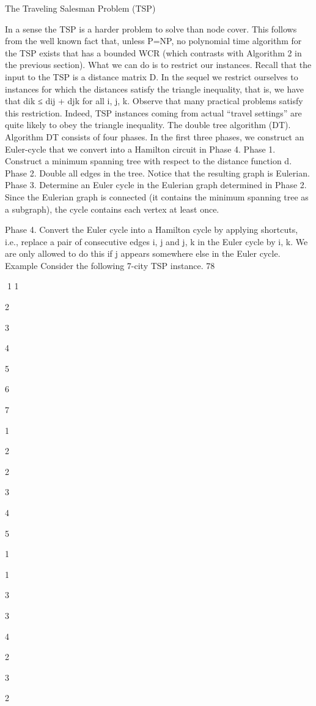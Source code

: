 \documentclass[titlepage]{book}
\theoremstyle{plain}
\theoremstyle{definition}
\theoremstyle{remark}
\begin{document}
The Traveling Salesman Problem (TSP)

In a sense the TSP is a harder problem to solve than node cover. This follows from the well known fact
that, unless P=NP, no polynomial time algorithm for the TSP exists that has a bounded WCR (which
contrasts with Algorithm 2 in the previous section).
What we can do is to restrict our instances. Recall that the input to the TSP is a distance matrix D. In
the sequel we restrict ourselves to instances for which the distances satisfy the triangle inequality, that is,
we have that dik ≤ dij + djk for all i, j, k. Observe that many practical problems satisfy this restriction.
Indeed, TSP instances coming from actual “travel settings” are quite likely to obey the triangle inequality.
The double tree algorithm (DT).
Algorithm DT consists of four phases. In the first three phases, we construct an Euler-cycle that we
convert into a Hamilton circuit in Phase 4.
Phase 1. Construct a minimum spanning tree with respect to the distance function d.
Phase 2. Double all edges in the tree. Notice that the resulting graph is Eulerian.
Phase 3. Determine an Euler cycle in the Eulerian graph determined in Phase 2. Since the Eulerian
graph is connected (it contains the minimum spanning tree as a subgraph), the cycle contains each vertex
at least once.

Phase 4. Convert the Euler cycle into a Hamilton cycle by applying shortcuts, i.e., replace a pair of
consecutive edges {i, j} and {j, k} in the Euler cycle by {i, k}. We are only allowed to do this if j appears
somewhere else in the Euler cycle.
Example Consider the following 7-city TSP instance.
78

1
1

2

3

4

5

6

7

1

2

2

3

4

5

1

1

3

3

4

2

3

2
\end{document}
